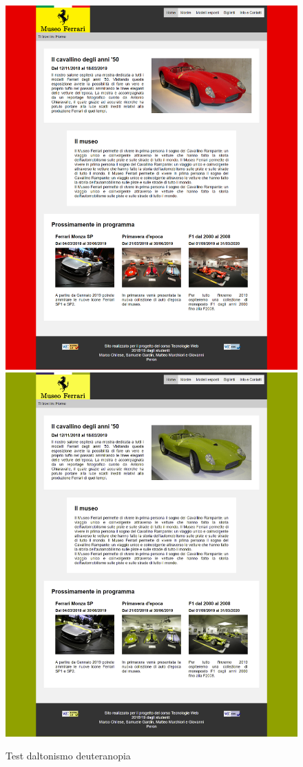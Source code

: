 \begin{figure}[!h]
	\begin{center}
		\includegraphics[scale=0.144]{Images/original.png}
		\includegraphics[scale=0.144]{Images/deuteranopia.png}
		\caption{Test daltonismo deuteranopia}
	\end{center}
\end{figure}
